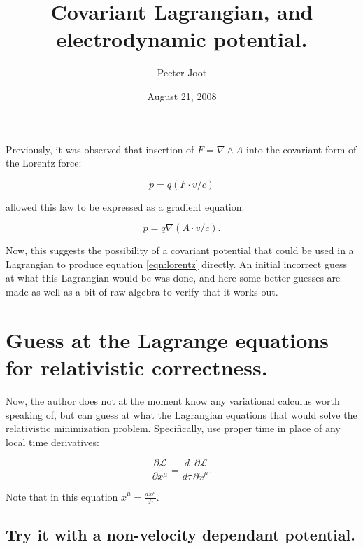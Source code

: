 \documentclass{article}
\title{ Covariant Lagrangian, and electrodynamic potential. }
\author{Peeter Joot}
\date{August 21, 2008}
\newcommand{\grad}[0] {\nabla}
\begin{document}
\maketitle{}

\section{}

Previously, it was observed that insertion of $F = \grad \wedge A$ into
the covariant form of the Lorentz force:

\begin{equation}\label{eqn:lorentz}
\dot{p} = q (F \cdot v/c)
\end{equation}

allowed this law to be expressed as a gradient equation:

\begin{equation}
\dot{p} = q \grad (A \cdot v/c).
\end{equation}

Now, this suggests the possibility of a covariant potential that could be 
used in a Lagrangian to produce equation \ref{eqn:lorentz} directly.  An
initial incorrect guess at what this Lagrangian would be was done, and
here some better guesses are made as well as a bit of raw algebra to verify
that it works out.

\section{ Guess at the Lagrange equations for relativistic correctness. }

Now, the author does not at the moment know any variational calculus worth
speaking of, but can guess at what the Lagrangian equations that would 
solve the relativistic minimization problem.  Specifically, use proper
time in place of any local time derivatives:

\begin{equation}
\frac{\partial \mathcal{L}}{\partial x^{\mu}} = 
\frac{d}{d\tau} \frac{\partial \mathcal{L}}{\partial \dot{x}^{\mu}}.
\end{equation}

Note that in this equation $\dot{x}^{\mu} = \frac{d x^{\mu}}{d\tau}$.

\subsection{ Try it with a non-velocity dependant potential. }
\end{document}
